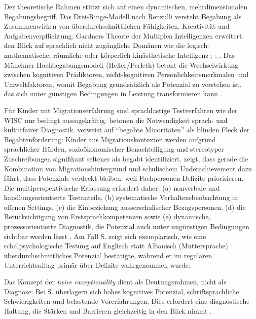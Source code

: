 \documentclass[ngerman, a4paper]{article}
\begin{document}
Der theoretische Rahmen stützt sich auf einen dynamischen, mehrdimensionalen
Begabungsbegriff. Das Drei-Ringe-Modell nach Renzulli versteht Begabung als
Zusammenwirken von überdurchschnittlichen Fähigkeiten, Kreativität und
Aufgabenverpflichtung.
Gardners Theorie der Multiplen Intelligenzen erweitert den Blick auf sprachlich
nicht zugängliche Domänen wie die logisch-mathematische, räumliche oder
körperlich-kinästhetische Intelligenz
\parencite{muelleroppliger2021handbuch};
\parencite[S.\,74--75]{hoyer2013begabung};
\parencite[S.\,34--41]{trautmann2016einfuehrung}.
Das Münchner Hochbegabungsmodell (Heller/Perleth) betont die Wechselwirkung
zwischen kognitiven Prädiktoren, nicht-kognitiven Persönlichkeitsmerkmalen und
Umweltfaktoren, womit Begabung grundsätzlich als Potenzial zu verstehen ist, das sich
unter günstigen Bedingungen in Leistung transformieren kann
\parencite[S.\,76]{fischer2020begabungsfoerderung}.
 
Für Kinder mit Migrationserfahrung sind sprachlastige Testverfahren wie der WISC nur
bedingt aussagekräftig. \textcite[S.\,14\psq;\,29--31]{maehler2018diagnostik} betonen die Notwendigkeit
sprach- und kulturfairer Diagnostik. \textcite[S.\,576--585]{stamm2021fehlenderblick}
verweist auf \enquote{begabte Minoritäten} als blinden Fleck der Begabtenförderung:
Kinder aus Migrationskontexten werden aufgrund
sprachlicher Hürden, sozioökonomischer Benachteiligung und stereotyper Zuschreibungen
signifikant seltener als begabt identifiziert.
\textcite[S.\,76--78]{kellerkoller2021hellekoepfe} zeigt, dass gerade die Kombination von Migrationshintergrund und
schulischem Underachievement dazu führt, dass Potenziale verdeckt bleiben, weil
Fachpersonen Defizite priorisieren.
Die multiperspektivische Erfassung erfordert daher: (a) nonverbale und handlungsorientierte
Testanteile, (b) systematische Verhaltensbeobachtung in offenen Settings,
(c) die Einbeziehung ausserschulischer Bezugspersonen, (d) die Berücksichtigung von
Erstsprachkompetenzen sowie (e) dynamische, prozessorientierte Diagnostik, die Potenzial
auch unter ungünstigen Bedingungen sichtbar werden lässt
\parencite[S.\,224--238]{muelleroppliger2021paeddiagnostik}.
Am Fall S. zeigt sich exemplarisch, wie eine schulpsychologische Testung auf Englisch
statt Albanisch (Muttersprache) überdurchschnittliches Potenzial bestätigte, während er im regulären
Unterrichtsalltag primär über Defizite wahrgenommen wurde.
 
Das Konzept der \textit{twice exceptionality} dient als Deutungsrahmen, nicht als Diagnose:
Bei S. überlagern sich hohes kognitives Potenzial, schriftsprachliche Schwierigkeiten und
belastende Vorerfahrungen. Dies erfordert eine diagnostische Haltung,
die Stärken und Barrieren gleichzeitig in den Blick nimmt
\parencite[Kap.\,2.2]{preckel2013hochbegabung}.
\end{document}
